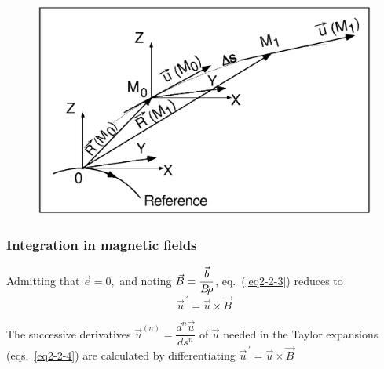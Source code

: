 \begin{figure}[H]
\centerline{\includegraphics[width=14cm]{Fig2.ps}}
\end{figure}

\subsubsection{Integration in magnetic fields} \label{sec2.2.1}  %

Admitting that $ \vec  e=0, $ and noting $ \vec B=\dfrac{\vec  b}{B\!\rho} $, 
eq.~(\ref{eq2-2-3}) 
reduces to 
$$ \vec  u^{\,\prime}  = \vec  u  \times  \vec  B $$

\noindent The successive derivatives $\vec  u^{(n)} = \dfrac{d^n\vec  u }{ds^n} $ of 
$ \vec  u $ needed in the Taylor expansions (eqs.~\ref{eq2-2-4}) are calculated by differentiating 
$ \vec  u^{\,\prime}            =\vec  u  \times  \vec  B$ 

